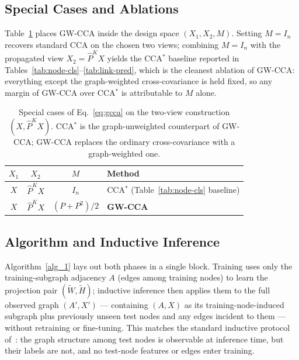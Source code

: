 \documentclass{article}
\begin{document}
\subsection{Special Cases and Ablations}
\label{sec:apply:special}

Table~\ref{tab:special-cases} places GW-CCA inside the design space
$(X_1, X_2, M)$. Setting $M = I_n$ recovers standard CCA on the chosen two
views; combining $M = I_n$ with the propagated view $X_2 = \widehat{P}^K X$
yields the CCA$^\ast$ baseline reported in
Tables~\ref{tab:node-cls}--\ref{tab:link-pred}, which is the cleanest
ablation of GW-CCA: everything except the graph-weighted cross-covariance
is held fixed, so any margin of GW-CCA over CCA$^\ast$ is attributable to
$M$ alone.

\begin{table}[ht]
\caption{Special cases of Eq.~\ref{eq:gcca} on the two-view construction
$(X, \widehat{P}^K X)$. CCA$^\ast$ is the graph-unweighted counterpart of
GW-CCA; GW-CCA replaces the ordinary cross-covariance with a
graph-weighted one.}
\label{tab:special-cases}
\centering
\begin{tabular}{cccl}
\toprule
$X_1$ & $X_2$ & $M$ & Method \\
\midrule
$X$               & $\widehat{P}^K X$ & $I_n$            & CCA$^\ast$ (Table~\ref{tab:node-cls} baseline) \\
$X$               & $\widehat{P}^K X$ & $(P + P^2)/2$    & \textbf{GW-CCA} \\
\bottomrule
\end{tabular}
\end{table}

\subsection{Algorithm and Inductive Inference}
\label{sec:apply:algorithm}

Algorithm~\ref{alg_1} lays out both phases in a single block. Training uses
only the training-subgraph adjacency $A$ (edges among training nodes) to
learn the projection pair $(\widetilde{W}, \widetilde{H})$; inductive
inference then applies them to the full observed graph $(A', X')$ ---
containing $(A, X)$ as its training-node-induced subgraph plus previously
unseen test nodes and any edges incident to them --- without retraining or
fine-tuning. This matches the standard inductive protocol
of~\citet{hamilton2017inductive}: the graph structure among test nodes is
observable at inference time, but their labels are not, and no test-node
features or edges enter training.
\end{document}
